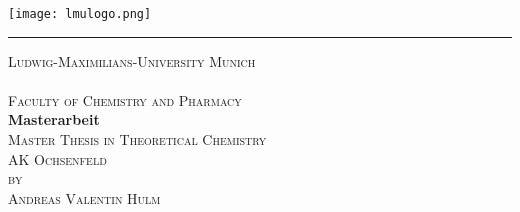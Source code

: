 
\begin{titlepage}

\begin{center}
{

\vspace*{-1.5cm}
\hfill \texttt{[image: lmulogo.png]}

\hrule                                 %

\textsc{\LARGE Ludwig-Maximilians-University Munich}\\[2cm]

\textsc{\Large }\\[0.5cm]

\textsc{\Large Faculty of Chemistry and Pharmacy}\\[2.5cm]

\textbf{\LARGE Masterarbeit} \\[0.5cm]

\textsc{\Large Master Thesis in Theoretical Chemistry}\\[2.0cm]

\textsc{AK Ochsenfeld}\\[2.0cm]

\textsc{by}\\
\textsc{Andreas Valentin Hulm} \\[1,5cm]


\vspace{3.5cm}


}
\end{center}

\end{titlepage}


